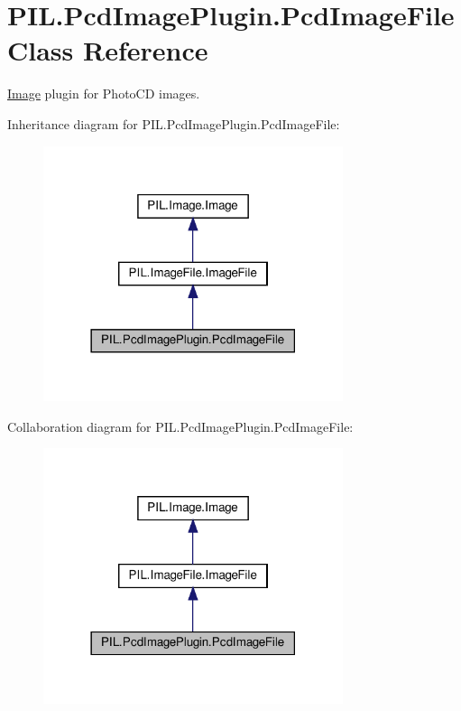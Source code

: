 \hypertarget{classPIL_1_1PcdImagePlugin_1_1PcdImageFile}{}\section{P\+I\+L.\+Pcd\+Image\+Plugin.\+Pcd\+Image\+File Class Reference}
\label{classPIL_1_1PcdImagePlugin_1_1PcdImageFile}


\hyperlink{namespacePIL_1_1Image}{Image} plugin for Photo\+CD images.  




Inheritance diagram for P\+I\+L.\+Pcd\+Image\+Plugin.\+Pcd\+Image\+File\+:
\nopagebreak
\begin{figure}[H]
\begin{center}
\leavevmode
\includegraphics[width=249pt]{classPIL_1_1PcdImagePlugin_1_1PcdImageFile__inherit__graph}
\end{center}
\end{figure}


Collaboration diagram for P\+I\+L.\+Pcd\+Image\+Plugin.\+Pcd\+Image\+File\+:
\nopagebreak
\begin{figure}[H]
\begin{center}
\leavevmode
\includegraphics[width=249pt]{classPIL_1_1PcdImagePlugin_1_1PcdImageFile__coll__graph}
\end{center}
\end{figure}
